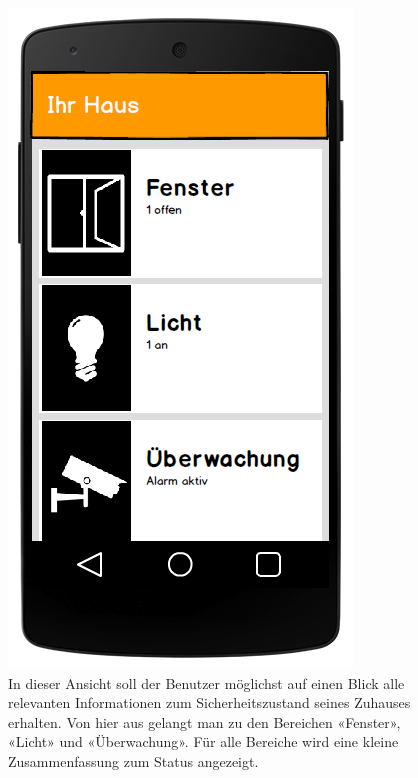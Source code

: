 \begin{figure}[H]
	\centering
		\includegraphics[scale=0.3]{report/img/mockup_overview.png}
	\caption{In dieser Ansicht soll der Benutzer möglichst auf einen Blick alle relevanten Informationen zum Sicherheitszustand seines Zuhauses erhalten. Von hier aus gelangt man zu den Bereichen «Fenster», «Licht» und «Überwachung». Für alle Bereiche wird eine kleine Zusammenfassung zum Status angezeigt.}
	\label{fig:mockupOverview}
\end{figure}


